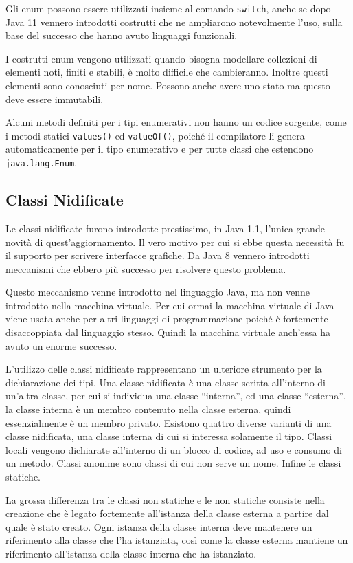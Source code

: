 \documentclass{article}
\numberwithin{equation}{subsection}
\begin{document}
Gli enum possono essere utilizzati insieme al comando \verb|switch|, anche se dopo Java 11 vennero introdotti costrutti che ne ampliarono notevolmente l'uso, sulla base del 
successo che hanno avuto linguaggi funzionali. 

I costrutti enum vengono utilizzati quando bisogna modellare collezioni di elementi noti, finiti e stabili, è molto difficile che cambieranno. Inoltre questi elementi sono conosciuti 
per nome. Possono anche avere uno stato ma questo deve essere immutabili. 

Alcuni metodi definiti per i tipi enumerativi non hanno un codice sorgente, come i metodi statici \verb|values()| ed \verb|valueOf()|, poiché il compilatore li genera automaticamente per il tipo 
enumerativo e per tutte classi che estendono \verb|java.lang.Enum|. 

\subsection{Classi Nidificate}

Le classi nidificate furono introdotte prestissimo, in Java 1.1, l'unica grande novità di quest'aggiornamento. 
Il vero motivo per cui si ebbe questa necessità fu il supporto per scrivere interfacce grafiche. 
Da Java 8 vennero introdotti meccanismi che ebbero più successo per risolvere questo problema. 

Questo meccanismo venne introdotto nel linguaggio Java, ma non venne introdotto nella macchina virtuale. Per cui ormai la macchina virtuale di Java viene usata anche per 
altri linguaggi di programmazione poiché è fortemente disaccoppiata dal linguaggio stesso. Quindi la macchina virtuale anch'essa ha avuto un enorme successo. 

L'utilizzo delle classi nidificate rappresentano un ulteriore strumento per la dichiarazione dei tipi. 
Una classe nidificata è una classe scritta all'interno di un'altra classe, per cui si individua una classe ``interna'', ed una classe ``esterna'', la classe interna è un 
membro contenuto nella classe esterna, quindi essenzialmente è un membro privato. 
Esistono quattro diverse varianti di una classe nidificata, una classe interna di cui si interessa solamente il tipo. 
Classi locali vengono dichiarate all'interno di un blocco di codice, ad uso e consumo di un metodo. 
Classi anonime sono classi di cui non serve un nome. 
Infine le classi statiche. 

La grossa differenza tra le classi non statiche e le non statiche consiste nella creazione che è legato fortemente all'istanza della classe esterna a partire dal quale è stato 
creato. Ogni istanza della classe interna deve mantenere un riferimento alla classe che l'ha istanziata, così come la classe esterna mantiene un riferimento all'istanza 
della classe interna che ha istanziato.  
\end{document}
